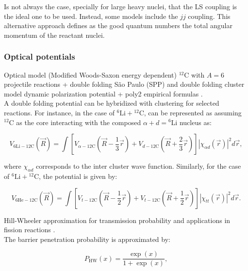 \documentclass[openany]{book}
\begin{document}
Is not always the case, specially for large heavy nuclei, that the LS coupling is the ideal one to be used. Instead, some models include the $jj$ coupling. This alternative approach defines as the good quantum numbers the total angular momentum of the reactant nuclei.

\subsubsection{Optical potentials} \label{sub:potential_effective_optical}

Optical model (Modified Woods-Saxon energy dependent) $\mathrm{{}^{12}C}$ with $A = 6$ projectile reactions + double folding São Paulo (SPP)  and double folding cluster model dynamic polarization potential + poly2 empirical formulas \cite{amer_penionzhkevich_2021}. \\

A double folding potential can be hybridized with clustering for selected reactions. For instance, in the case of $\mathrm{{}^{6}Li + {}^{12}C}$, can be represented as assuming $\mathrm{{}^{12}C}$ as the core interacting with the composed $\alpha + d = \mathrm{{}^{6}Li}$ nucleus as:

\begin{equation}\label{eq:potential_cluster_6Li12C}
	V_{\mathrm{6Li-12C}}(\vec R) = \int \left[V_{\alpha-\mathrm{12C}} \left(\vec R - \frac{1}{3} \vec r\right) + V_{d-\mathrm{12C}}\left(\vec R + \frac{2}{3} \vec r \right) \right]  |\chi_{\alpha d} (\vec r)|^2 d\vec r,
\end{equation} 

where $\chi_{\alpha d}$ corresponds to the inter cluster wave function. Similarly, for the case of $\mathrm{{}^{6}Li + {}^{12}C}$, the potential is given by:


\begin{equation}\label{eq:potential_cluster_6He12C}
	V_{\mathrm{6He-12C}}(\vec R) = \int \left[V_{t-\mathrm{12C}} \left(\vec R - \frac{1}{2} \vec r\right) + V_{t-\mathrm{12C}}\left(\vec R + \frac{1}{2} \vec r\right)  \right] |\chi_{t t} (\vec r)|^2 d\vec r .
\end{equation} 

Hill-Wheeler approximation for transmission probability and applications in fission reactions \cite{hill_wheeler_1953}. \\

The barrier penetration probability is approximated by:

\begin{equation}\label{eq:potential_hillWheeler}
	P_{\mathrm{HW}}(x) = \frac{\exp(x)}{1 + \exp(x)},
\end{equation}
\end{document}
